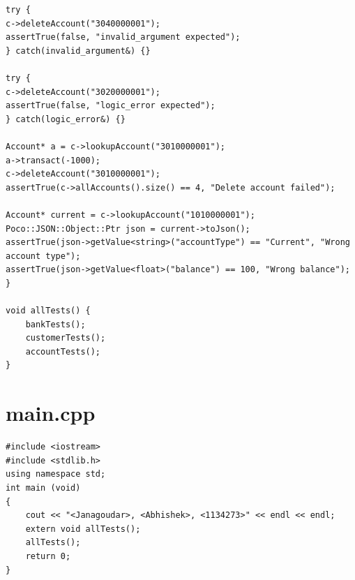 \documentclass[9pt,twocolumn]{article}
\begin{document}
\begin{lstlisting}
try {
c->deleteAccount("3040000001");
assertTrue(false, "invalid_argument expected");
} catch(invalid_argument&) {}

try {
c->deleteAccount("3020000001");
assertTrue(false, "logic_error expected");
} catch(logic_error&) {}

Account* a = c->lookupAccount("3010000001");
a->transact(-1000);
c->deleteAccount("3010000001");
assertTrue(c->allAccounts().size() == 4, "Delete account failed");

Account* current = c->lookupAccount("1010000001");
Poco::JSON::Object::Ptr json = current->toJson();
assertTrue(json->getValue<string>("accountType") == "Current", "Wrong account type");
assertTrue(json->getValue<float>("balance") == 100, "Wrong balance");
}

void allTests() {
    bankTests();
    customerTests();
    accountTests();
}
\end{lstlisting}

\section*{main.cpp}
\begin{lstlisting}
#include <iostream>
#include <stdlib.h>
using namespace std;
int main (void)
{
    cout << "<Janagoudar>, <Abhishek>, <1134273>" << endl << endl;
    extern void allTests();
    allTests();
    return 0;
}

\end{lstlisting}
\end{document}
